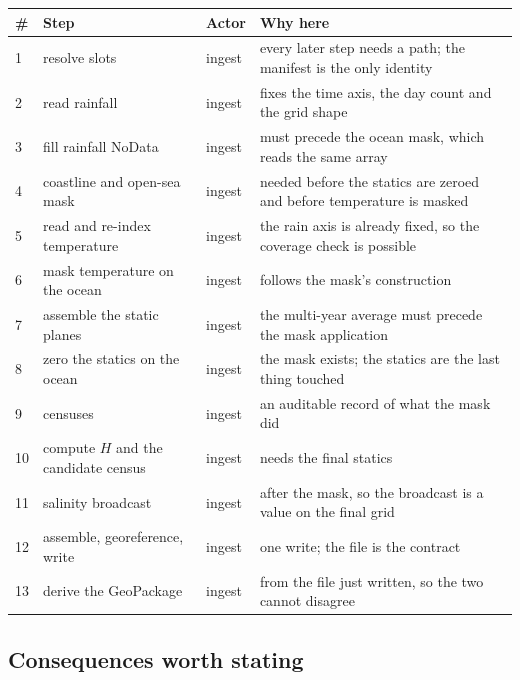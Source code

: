 \documentclass[11pt,a4paper]{article} \usepackage[utf8]{inputenc} \usepackage{lmodern} \usepackage[T1]{fontenc}
\begin{document}
\begin{center}
\small
\begin{longtable}{@{}p{0.6cm}p{4.4cm}p{3.4cm}p{5.4cm}@{}}
\toprule
\# & Step & Actor & Why here \\
\midrule
\endhead
1 & resolve slots & ingest & every later step needs a path; the manifest is the only identity \\
2 & read rainfall & ingest & fixes the time axis, the day count and the grid shape \\ 3 & fill
rainfall NoData & ingest & must precede the ocean mask, which reads the same array \\ 4 &
coastline and open-sea mask & ingest & needed before the statics are zeroed and before
temperature is masked \\ 5 & read and re-index temperature & ingest & the rain axis is already
fixed, so the coverage check is possible \\ 6 & mask temperature on the ocean & ingest & follows
the mask's construction \\ 7 & assemble the static planes & ingest & the multi-year average must
precede the mask application \\ 8 & zero the statics on the ocean & ingest & the mask exists;
the statics are the last thing touched \\ 9 & censuses & ingest & an auditable record of what
the mask did \\ 10 & compute $H$ and the candidate census & ingest & needs the final statics \\
11 & salinity broadcast & ingest & after the mask, so the broadcast is a value on the final grid
\\ 12 & assemble, georeference, write & ingest & one write; the file is the contract \\ 13 &
derive the GeoPackage & ingest & from the file just written, so the two cannot disagree \\
\bottomrule
\end{longtable}
\end{center}

\subsection{Consequences worth stating}
\end{document}
